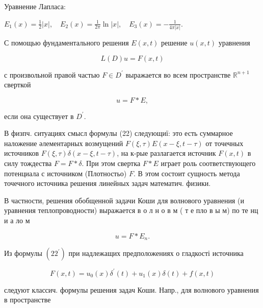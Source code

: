 \documentclass[10pt]{article}
\begin{document}
Уравнение Лапласа:



$E_{1}(x)=\frac{1}{2}|x|, \quad E_{2}(x)=\frac{1}{2 \pi} \ln |x|, \quad E_{3}(x)=-\frac{1}{4 \pi|x|}$.



С помощью фундаментального решения $E(x, t)$ решение $u(x, t)$ уравнения



\[

L(D) u=F(x, t)

\]



с произвольной правой частью $F \in D^{\prime}$ выражается во всем пространстве $\mathbb{R}^{n+1}$ сверткой



\[

u=F * E,

\]



если она существует в $D^{\prime}$.



В физпч. ситуациях смысл формулы (22) следующиї: это есть суммарное наложение әлементарных возмущений $F(\xi, \tau) E(x-\xi, t-\tau)$ от точечных источников $F(\xi, \tau) \delta(x-\xi, t-\tau)$, на к-рые разлагается источник $F(x, t)$ в силу тождества $F=F * \delta$. При этом свертка $F * E$ играет роль соответствующего потенциала с источником (Плотностьо) $F$. В этом состоит сущность метода точечного источника решения линейных задач математич. физики.



В частности, решения обобщенной задачи Коши для волнового уравнения (и уравнения теплопроводности) выражается в о л н о в м ( т е пло в ы м) по те нц и а ло м



\[

u=F * E_{n} .

\]



Из формулы $\left(22^{\prime}\right)$ при надлежащих предположениях о гладкості источника



\[

F(x, t)=u_{0}(x) \delta^{\prime}(t)+u_{1}(x) \delta(t)+f(x, t)

\]



следуют классич. формулы решения задач Коши. Напр., для волнового уравнения в пространстве
\end{document}
